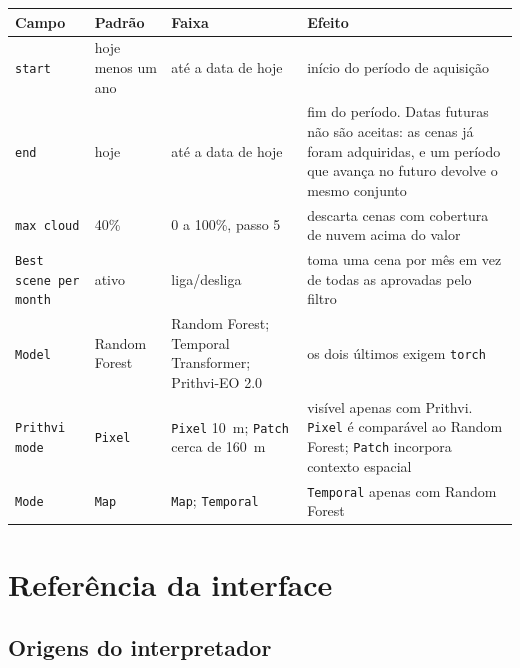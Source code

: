 \documentclass[12pt,a4paper]{article}
\begin{document}
\begin{center}
\label{tab:classif}
\small
\renewcommand{\arraystretch}{1.18}
\begin{tabular}{@{}L{3.0cm}L{2.7cm}L{3.0cm}L{6.6cm}@{}}
\toprule
\textbf{Campo} & \textbf{Padr\~ao} & \textbf{Faixa} & \textbf{Efeito} \\
\midrule
\texttt{start} & hoje menos um ano & at\'e a data de hoje & in\'icio do per\'iodo de aquisi\c{c}\~ao \\
\texttt{end} & hoje & at\'e a data de hoje & fim do per\'iodo. Datas futuras n\~ao s\~ao aceitas: as cenas j\'a foram adquiridas, e um per\'iodo que avan\c{c}a no futuro devolve o mesmo conjunto \\
\texttt{max cloud} & 40\% & 0 a 100\%, passo 5 & descarta cenas com cobertura de nuvem acima do valor \\
\texttt{Best scene per month} & ativo & liga/desliga & toma uma cena por m\^es em vez de todas as aprovadas pelo filtro \\
\texttt{Model} & Random Forest & Random Forest; Temporal Transformer; Prithvi-EO 2.0 & os dois \'ultimos exigem \texttt{torch} \\
\texttt{Prithvi mode} & \texttt{Pixel} & \texttt{Pixel} 10~m; \texttt{Patch} cerca de 160~m & vis\'ivel apenas com Prithvi. \texttt{Pixel} \'e compar\'avel ao Random Forest; \texttt{Patch} incorpora contexto espacial \\
\texttt{Mode} & \texttt{Map} & \texttt{Map}; \texttt{Temporal} & \texttt{Temporal} apenas com Random Forest \\
\bottomrule
\end{tabular}
\end{center}

\section{Refer\^encia da interface}

\subsection{Origens do interpretador}
\end{document}
